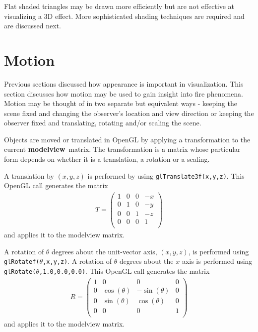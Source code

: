 \documentclass[11pt,twoside]{book}
\begin{document}
Flat shaded triangles may be drawn more efficiently but are not
effective at visualizing a 3D effect.  More sophisticated shading
techniques are required and are discussed next.

%
%

\section{Motion} Previous sections discussed how appearance is important
in visualization.  This section discusses how motion may be used to gain
insight into fire phenomena.  Motion may be thought of in two separate but
equivalent ways - keeping the scene fixed and changing the observer's location
and view direction or keeping the observer fixed and translating, rotating
and/or scaling the scene.

Objects are moved or translated in OpenGL by applying a transformation to
the current {\bf modelview}\ matrix.  The transformation is a matrix whose
particular form depends on whether it is a translation, a rotation or a scaling.

A translation by $(x,y,z)$ is performed by using {\tt glTranslate3f(x,y,z)}.
This OpenGL call generates the matrix
\begin{eqnarray*}
T=\left(%
\begin{array}{cccc}
  1 & 0 & 0 & -x \\
  0 & 1 & 0 & -y \\
  0 & 0 & 1 & -z \\
  0 & 0 & 0 & 1 \\
\end{array}%
\right)
\end{eqnarray*}
and applies it to the modelview matrix.

A rotation of $\theta$ degrees about the unit-vector axis, $(x,y,z)$,
is performed using {\tt glRotatef($\theta$,x,y,z)}.  A rotation of
$\theta$ degrees about the $x$ axis is performed using {\tt glRotate($\theta$,1.0,0.0,0.0)}.
This OpenGL call generates the matrix
\begin{eqnarray*}
R=\left(%
\begin{array}{cccc}
  1 & 0 & 0 & 0 \\
  0 & \cos(\theta) & -\sin(\theta) & 0 \\
  0 & \sin(\theta) & \cos(\theta) & 0 \\
  0 & 0 & 0 & 1 \\
\end{array}%
\right)
\end{eqnarray*}
and applies it to the modelview matrix.
\end{document}

